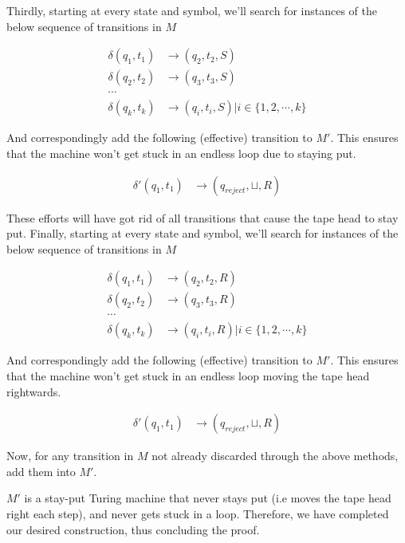 \documentclass{article}
\begin{document}
Thirdly, starting at every state and symbol, we'll search for instances of the below sequence of transitions in $M$

\begin{align*}
    \delta(q_1, t_1)             & \rightarrow (q_2, t_2, S) \\
    \delta(q_2, t_2)             & \rightarrow (q_3, t_3, S) \\
    \cdots \\
    \delta(q_k, t_k)             & \rightarrow (q_i, t_i, S) | i \in \{1, 2, \cdots , k\}
\end{align*}

And correspondingly add the following (effective) transition to $M'$. This ensures that the machine won't get stuck in an endless loop due to staying put.

\begin{align*}
    \delta'(q_1, t_1) & \rightarrow (q_{reject}, \sqcup, R)
\end{align*}

These efforts will have got rid of all transitions that cause the tape head to stay put. Finally, starting at every state and symbol, we'll search for instances of the below sequence of transitions in $M$

\begin{align*}
    \delta(q_1, t_1)             & \rightarrow (q_2, t_2, R) \\
    \delta(q_2, t_2)             & \rightarrow (q_3, t_3, R) \\
    \cdots \\
    \delta(q_k, t_k)             & \rightarrow (q_i, t_i, R) | i \in \{1, 2, \cdots , k\}
\end{align*}

And correspondingly add the following (effective) transition to $M'$. This ensures that the machine won't get stuck in an endless loop moving the tape head rightwards.

\begin{align*}
    \delta'(q_1, t_1) & \rightarrow (q_{reject}, \sqcup, R)
\end{align*}

Now, for any transition in $M$ not already discarded through the above methods, add them into $M'$.

$M'$ is a stay-put Turing machine that never stays put (i.e moves the tape head right each step), and never gets stuck in a loop. Therefore, we have completed our desired construction, thus concluding the proof.
\end{document}
